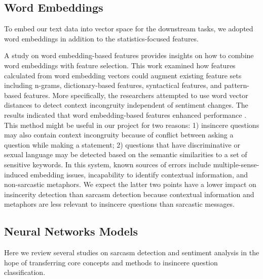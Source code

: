\documentclass[12pt]{diazessay} %
\begin{document}
{\subsection{Word Embeddings}

To embed our text data into vector space for the downstream tasks, we adopted word embeddings in addition to the statistics-focused features.

A study on word embedding-based features \citep{joshi2016} provides insights on how to combine word embeddings with feature selection. This work examined how features calculated from word embedding vectors could augment existing feature sets including n-grams, dictionary-based features, syntactical features, and pattern-based features. More specifically, the researchers attempted to use word vector distances to detect context incongruity independent of sentiment changes. The results indicated that word embedding-based features enhanced performance \citep{joshi2016}. This method might be useful in our project for two reasons: 1) insincere questions may also contain context incongruity because of conflict between asking a question while making a statement; 2) questions that have discriminative or sexual language may be detected based on the semantic similarities to a set of sensitive keywords.  In this system, known sources of errors include multiple-sense-induced embedding issues, incapability to identify contextual information, and non-sarcastic metaphors\citep{joshi2016}. We expect the latter two points have a lower impact on insincerity detection than sarcasm detection because contextual information and metaphors are less relevant to insincere questions than sarcastic messages. 



\subsection{Neural Networks Models} \label{nn-models}


Here we review several studies on sarcasm detection and sentiment analysis in the hope of transferring core concepts and methods to insincere question classification.

}
\end{document}
